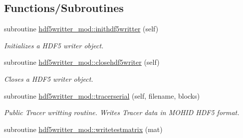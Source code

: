 \subsection*{Functions/\+Subroutines}
\begin{DoxyCompactItemize}
\item 
subroutine \mbox{\hyperlink{namespacehdf5writter__mod_a2409af91a67db06badcb9ae439142f92}{hdf5writter\+\_\+mod\+::inithdf5writter}} (self)
\begin{DoxyCompactList}\small\item\em Initializes a H\+D\+F5 writer object. \end{DoxyCompactList}\item 
subroutine \mbox{\hyperlink{namespacehdf5writter__mod_a0318c234490ab15f480e7f940266ec4f}{hdf5writter\+\_\+mod\+::closehdf5writer}} (self)
\begin{DoxyCompactList}\small\item\em Closes a H\+D\+F5 writer object. \end{DoxyCompactList}\item 
subroutine \mbox{\hyperlink{namespacehdf5writter__mod_a5f79038dbb067a692a12d171e51b5703}{hdf5writter\+\_\+mod\+::tracerserial}} (self, filename, blocks)
\begin{DoxyCompactList}\small\item\em Public Tracer writting routine. Writes Tracer data in M\+O\+H\+ID H\+D\+F5 format. \end{DoxyCompactList}\item 
subroutine \mbox{\hyperlink{namespacehdf5writter__mod_adc4cbad9398ee6e9cb5723a30a7c44b1}{hdf5writter\+\_\+mod\+::writetestmatrix}} (mat)
\end{DoxyCompactItemize}
